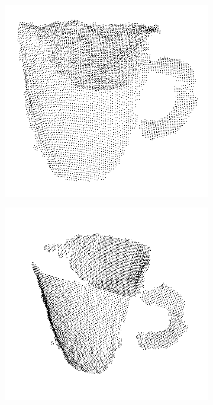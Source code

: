 \begin{figure}[t]
	\centering
	\begin{subfigure}[b]{0.4\textwidth}
		\includegraphics[width=\textwidth]{img/ejemplos_nubes/taza_01.png}
	\end{subfigure}
	\quad
	\begin{subfigure}[b]{0.4\textwidth}
		\includegraphics[width=\textwidth]{img/ejemplos_nubes/taza_02.png}
	\end{subfigure}


\end{figure}
